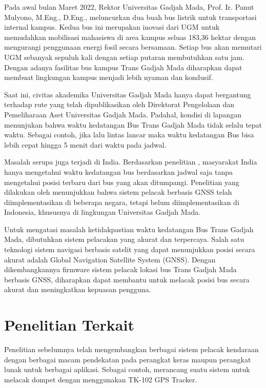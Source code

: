 \documentclass[conference]{IEEEtran}
\begin{document}
Pada awal bulan Maret 2022, Rektor Universitas Gadjah Mada, Prof. Ir. Panut Mulyono, M.Eng., D.Eng., meluncurkan dua buah bus listrik untuk transportasi internal kampus. Kedua bus ini merupakan inovasi dari UGM untuk memudahkan mobilisasi mahasiswa di area kampus seluas 183,36 hektar dengan mengurangi penggunaan energi fosil secara bersamaan. Setiap bus akan memutari UGM sebanyak sepuluh kali dengan setiap putaran membutuhkan satu jam. Dengan adanya fasilitas bus kampus Trans Gadjah Mada diharapkan dapat membuat lingkungan kampus menjadi lebih nyaman dan kondusif.

Saat ini, civitas akademika Universitas Gadjah Mada hanya dapat bergantung terhadap rute yang telah dipublikasikan oleh Direktorat Pengelolaan dan Pemeliharaan Aset Universitas Gadjah Mada. Padahal, kondisi di lapangan menunjukan bahwa waktu kedatangan Bus Trans Gadjah Mada tidak selalu tepat waktu. Sebagai contoh, jika lalu lintas lancar maka waktu kedatangan Bus bisa lebih cepat hingga 5 menit dari waktu pada jadwal. 

Masalah serupa juga terjadi di India. Berdasarkan penelitian \cite{Sutar2016}, masyarakat India hanya mengetahui waktu kedatangan bus berdasarkan jadwal saja tanpa mengetahui posisi terbaru dari bus yang akan ditumpangi. Penelitian yang dilakukan oleh \cite{Sneha2014} menunjukkan bahwa sistem pelacak berbasis GNSS telah diimplementasikan di beberapa negara, tetapi belum diimplementasikan di Indonesia, khususnya di lingkungan Universitas Gadjah Mada.

Untuk mengatasi masalah ketidakpastian waktu kedatangan Bus Trans Gadjah Mada, dibutuhkan sistem pelacakan yang akurat dan terpercaya. Salah satu teknologi sistem navigasi berbasis satelit yang dapat menunjukkan posisi secara akurat adalah Global Navigation Satellite System (GNSS). Dengan dikembangkannya firmware sistem pelacak lokasi bus Trans Gadjah Mada berbasis GNSS, diharapkan dapat membantu untuk melacak posisi bus secara akurat dan meningkatkan kepuasan pengguna.

\section{Penelitian Terkait}
Penelitian sebelumnya telah mengembangkan berbagai sistem pelacak kendaraan dengan berbagai macam pendekatan pada perangkat keras maupun perangkat lunak untuk berbagai aplikasi. Sebagai contoh, \cite{Ekhsan2022} merancang suatu sistem untuk melacak dompet dengan menggunakan TK-102 GPS Tracker.
\end{document}
